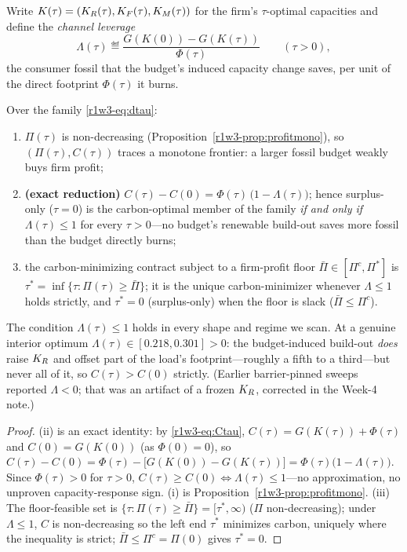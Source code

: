 Write $K(\tau)=(K_R(\tau),K_F(\tau),K_M(\tau))$ for the firm's $\tau$-optimal capacities
and define the \emph{channel leverage}
\begin{equation}\label{r1w3-eq:leverage}
  \Lambda(\tau)\eqdef\frac{G(K(0))-G(K(\tau))}{\Phi(\tau)}\qquad(\tau>0),
\end{equation}
the consumer fossil that the budget's induced capacity change saves, per unit of the
direct footprint $\Phi(\tau)$ it burns.

\begin{theorem}\label{r1w3-thm:frontier}
Over the family \eqref{r1w3-eq:dtau}:
\begin{enumerate}[leftmargin=2em,itemsep=1pt]
\item[\textup{(i)}] $\Pi(\tau)$ is non-decreasing (Proposition~\ref{r1w3-prop:profitmono}), so
$(\Pi(\tau),C(\tau))$ traces a monotone frontier: a larger fossil budget weakly buys firm
profit;
\item[\textup{(ii)}] \textbf{(exact reduction)} $C(\tau)-C(0)=\Phi(\tau)\,\big(1-\Lambda(\tau)\big)$;
hence surplus-only ($\tau=0$) is the carbon-optimal member of the family \emph{if and only
if} $\Lambda(\tau)\le1$ for every $\tau>0$---no budget's renewable build-out saves more
fossil than the budget directly burns;
\item[\textup{(iii)}] the carbon-minimizing contract subject to a firm-profit floor
$\bar\Pi\in[\Pi^{c},\Pi^{*}]$ is $\tau^{*}=\inf\{\tau:\Pi(\tau)\ge\bar\Pi\}$; it is the
unique carbon-minimizer whenever $\Lambda\le1$ holds strictly, and $\tau^{*}=0$
(surplus-only) when the floor is slack ($\bar\Pi\le\Pi^{c}$).
\end{enumerate}
The condition $\Lambda(\tau)\le1$ holds in every shape and regime we scan. At a genuine
interior optimum $\Lambda(\tau)\in[0.218,0.301]>0$: the budget-induced build-out \emph{does}
raise $K_R$ and offset part of the load's footprint---roughly a fifth to a third---but never
all of it, so $C(\tau)>C(0)$ strictly. (Earlier barrier-pinned sweeps reported $\Lambda<0$;
that was an artifact of a frozen $K_R$, corrected in the Week-4 note.)
\end{theorem}
\begin{proof}
(ii) is an exact identity: by \eqref{r1w3-eq:Ctau}, $C(\tau)=G(K(\tau))+\Phi(\tau)$ and
$C(0)=G(K(0))$ (as $\Phi(0)=0$), so
$C(\tau)-C(0)=\Phi(\tau)-\big[G(K(0))-G(K(\tau))\big]=\Phi(\tau)\big(1-\Lambda(\tau)\big)$.
Since $\Phi(\tau)>0$ for $\tau>0$, $C(\tau)\ge C(0)\Leftrightarrow\Lambda(\tau)\le1$---no
approximation, no unproven capacity-response sign. (i) is Proposition~\ref{r1w3-prop:profitmono}.
(iii) The floor-feasible set is $\{\tau:\Pi(\tau)\ge\bar\Pi\}=[\tau^{*},\infty)$ ($\Pi$
non-decreasing); under $\Lambda\le1$, $C$ is non-decreasing so the left end $\tau^{*}$
minimizes carbon, uniquely where the inequality is strict; $\bar\Pi\le\Pi^{c}=\Pi(0)$
gives $\tau^{*}=0$.
\end{proof}

